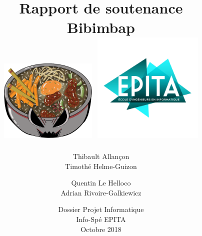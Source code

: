 \documentclass[12pt]{report}
\begin{document}
\title{
	{\vspace{4em}\Huge Rapport de soutenance}\\%
	{\large Bibimbap}\\%
    \protect\centering\protect\includegraphics[width=0.35\textwidth]{logo_bibimbap2}
    \protect\centering\protect\includegraphics[width=0.4\textwidth]{logo_epita}
}
\author{
	Thibault Allançon\\
	Timothé Helme-Guizon
	\and
	Quentin Le Helloco\\
	Adrian Rivoire-Galkiewicz}
\date{
    \vfill
	Dossier Projet Informatique\\
	Info-Spé EPITA\\
	Octobre 2018
}

\maketitle
\tableofcontents








\end{document}
